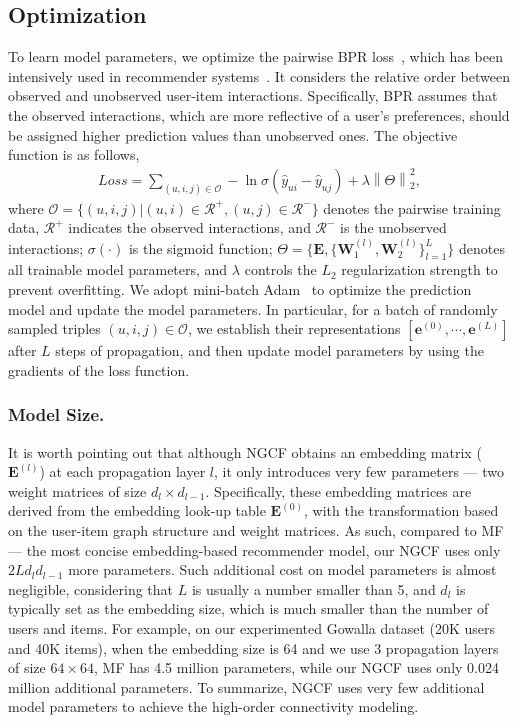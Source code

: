 \documentclass[sigconf]{acmart}
\newcommand\norm[1]{\left\lVert#1\right\rVert}
\newcommand{\Mat}[1]{\mathbf{#1}}
\newcommand{\Set}[1]{\mathcal{#1}}
\theoremstyle{definition}
\begin{document}
\subsection{Optimization}
To learn model parameters, we optimize the pairwise BPR loss~\cite{BPRMF}, which has been intensively used in recommender systems~\cite{ACF,APR}. It considers the relative order between observed and unobserved user-item interactions.
Specifically, BPR assumes that the observed interactions, which are more reflective of a user's preferences, should be assigned higher prediction values than unobserved ones.
The objective function is as follows,
\begin{gather}\label{equ:loss}
	Loss = \sum_{(u,i,j)\in\Set{O}}-\ln\sigma(\hat{y}_{ui}-\hat{y}_{uj})+\lambda\norm{\Theta}^{2}_{2},
\end{gather}
where $\Set{O}=\{(u,i,j)|(u,i)\in\Set{R}^{+}, (u,j)\in\Set{R}^{-}\}$ denotes the pairwise training data, $\Set{R}^{+}$ indicates the observed interactions, and $\Set{R}^{-}$ is the unobserved interactions;
$\sigma(\cdot)$ is the sigmoid function;
$\Theta=\{\Mat{E}, \{\Mat{W}^{(l)}_{1}, \Mat{W}^{(l)}_{2}\}_{l=1}^L \}$ denotes all trainable model parameters, and $\lambda$ controls the $L_2$ regularization strength to prevent overfitting. We adopt mini-batch Adam~\cite{Adam} to optimize the prediction model and update the model parameters.
In particular, for a batch of randomly sampled triples $(u,i,j)\in\Set{O}$, we establish their representations $[\Mat{e}^{(0)},\cdots,\Mat{e}^{(L)}]$ after $L$ steps of propagation, and then update model parameters by using the gradients of the loss function.

\subsubsection{\textbf{Model Size.}} It is worth pointing out that although NGCF obtains an embedding matrix ($\textbf{E}^{(l)}$) at each propagation layer $l$, it only introduces very few parameters --- two weight matrices of size $d_l\times d_{l-1}$. Specifically, these embedding matrices are derived from the embedding look-up table $\textbf{E}^{(0)}$, with the transformation based on the user-item graph structure and weight matrices. 
As such, compared to MF --- the most concise embedding-based recommender model, our NGCF uses only $2L d_l d_{l-1}$ more parameters. 
Such additional cost on model parameters is almost negligible, considering that $L$ is usually a number smaller than 5, and $d_l$ is typically set as the embedding size, which is much smaller than the number of users and items. For example, on our experimented Gowalla dataset (20K users and 40K items), when the embedding size is 64 and we use $3$ propagation layers of size $64\times64$, MF has 4.5 million parameters, while our NGCF uses only 0.024 million additional parameters. To summarize, NGCF uses very few additional model parameters to achieve the high-order connectivity modeling. 
\end{document}
